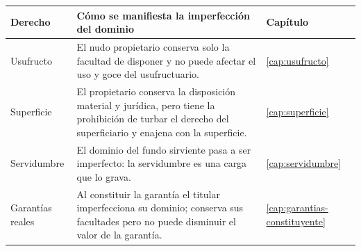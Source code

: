 \documentclass[12pt,oneside]{book}
\begin{document}
\begin{table}[H]
\centering
\begin{tabularx}{\textwidth}{>{\raggedright\arraybackslash}p{}>{\raggedright\arraybackslash}X>{\raggedright\arraybackslash}p{}}
\toprule
\textbf{Derecho} & \textbf{Cómo se manifiesta la imperfección del dominio} & \textbf{Capítulo} \\
\midrule
Usufructo & El nudo propietario conserva solo la facultad de disponer y no puede afectar el uso y goce del usufructuario. & \ref{cap:usufructo} \\
Superficie & El propietario conserva la disposición material y jurídica, pero tiene la prohibición de turbar el derecho del superficiario y enajena con la superficie. & \ref{cap:superficie} \\
Servidumbre & El dominio del fundo sirviente pasa a ser imperfecto: la servidumbre es una carga que lo grava. & \ref{cap:servidumbre} \\
Garantías reales & Al constituir la garantía el titular imperfecciona su dominio; conserva sus facultades pero no puede disminuir el valor de la garantía. & \ref{cap:garantias-constituyente} \\
\bottomrule
\end{tabularx}
\end{table}
\end{document}
